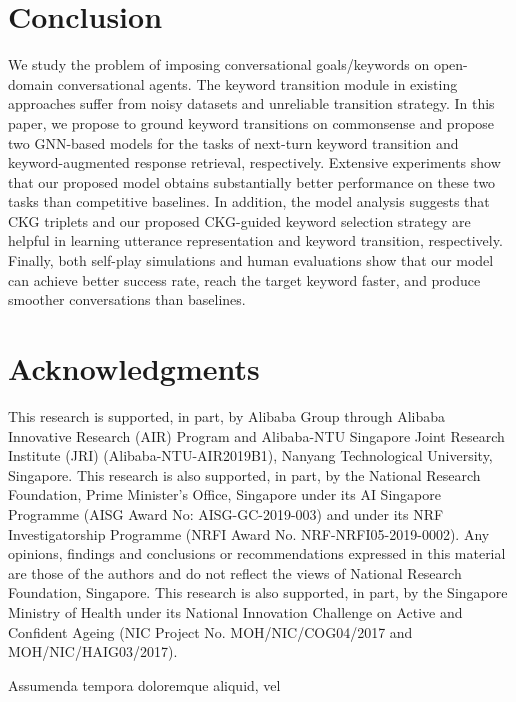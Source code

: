 \documentclass[letterpaper]{article} %
\begin{document}
\section{Conclusion}
\label{sec: conclusion}
We study the problem of imposing conversational goals/keywords on open-domain conversational agents. The keyword transition module in existing approaches suffer from noisy datasets and unreliable transition strategy. In this paper, we propose to ground keyword transitions on commonsense and propose two GNN-based models for the tasks of next-turn keyword transition and keyword-augmented response retrieval, respectively. Extensive experiments show that our proposed model obtains substantially better performance on these two tasks than competitive baselines. In addition, the model analysis suggests that CKG triplets and our proposed CKG-guided keyword selection strategy are helpful in learning utterance representation and keyword transition, respectively. Finally, both self-play simulations and human evaluations show that our model can achieve better success rate, reach the target keyword faster, and produce smoother conversations than baselines.

\section*{Acknowledgments}
This research is supported, in part, by Alibaba Group through Alibaba Innovative Research (AIR) Program and Alibaba-NTU Singapore Joint Research Institute (JRI) (Alibaba-NTU-AIR2019B1), Nanyang Technological University, Singapore. This research is also supported, in part, by the National Research Foundation, Prime Minister's Office, Singapore under its AI Singapore Programme (AISG Award No: AISG-GC-2019-003) and under its NRF Investigatorship Programme (NRFI Award No. NRF-NRFI05-2019-0002). Any opinions, findings and conclusions or recommendations expressed in this material are those of the authors and do not reflect the views of National Research Foundation, Singapore. This research is also supported, in part, by the Singapore Ministry of Health under its National Innovation Challenge on Active and Confident Ageing (NIC Project No. MOH/NIC/COG04/2017 and MOH/NIC/HAIG03/2017).

Assumenda tempora doloremque aliquid, vel

\end{document}
